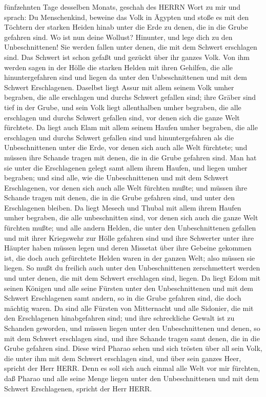 fünfzehnten Tage desselben Monats, geschah des HERRN Wort zu mir und
sprach:  Du Menschenkind, beweine das Volk in Ägypten und
stoße es mit den Töchtern der starken Heiden hinab unter die Erde zu
denen, die in die Grube gefahren sind.  Wo ist nun deine
Wollust? Hinunter, und lege dich zu den Unbeschnittenen! 
Sie werden fallen unter denen, die mit dem Schwert erschlagen sind. Das
Schwert ist schon gefaßt und gezückt über ihr ganzes Volk. 
Von ihm werden sagen in der Hölle die starken Helden mit ihren Gehilfen,
die alle hinuntergefahren sind und liegen da unter den Unbeschnittenen
und mit dem Schwert Erschlagenen.  Daselbst liegt Assur mit
allem seinem Volk umher begraben, die alle erschlagen und durchs Schwert
gefallen sind;  ihre Gräber sind tief in der Grube, und
sein Volk liegt allenthalben umher begraben, die alle erschlagen und
durchs Schwert gefallen sind, vor denen sich die ganze Welt fürchtete.
 Da liegt auch Elam mit allem seinem Haufen umher begraben,
die alle erschlagen und durchs Schwert gefallen sind und
hinuntergefahren als die Unbeschnittenen unter die Erde, vor denen sich
auch alle Welt fürchtete; und müssen ihre Schande tragen mit denen, die
in die Grube gefahren sind.  Man hat sie unter die
Erschlagenen gelegt samt allem ihrem Haufen, und liegen umher begraben;
und sind alle, wie die Unbeschnittenen und mit dem Schwert Erschlagenen,
vor denen sich auch alle Welt fürchten mußte; und müssen ihre Schande
tragen mit denen, die in die Grube gefahren sind, und unter den
Erschlagenen bleiben.  Da liegt Mesech und Thubal mit allem
ihrem Haufen umher begraben, die alle unbeschnitten sind, vor denen sich
auch die ganze Welt fürchten mußte;  und alle andern
Helden, die unter den Unbeschnittenen gefallen und mit ihrer Kriegswehr
zur Hölle gefahren sind und ihre Schwerter unter ihre Häupter haben
müssen legen und deren Missetat über ihre Gebeine gekommen ist, die doch
auch gefürchtete Helden waren in der ganzen Welt; also müssen sie
liegen.  So mußt du freilich auch unter den Unbeschnittenen
zerschmettert werden und unter denen, die mit dem Schwert erschlagen
sind, liegen.  Da liegt Edom mit seinen Königen und alle
seine Fürsten unter den Unbeschnittenen und mit dem Schwert Erschlagenen
samt andern, so in die Grube gefahren sind, die doch mächtig waren.
 Da sind alle Fürsten von Mitternacht und alle Sidonier,
die mit den Erschlagenen hinabgefahren sind; und ihre schreckliche
Gewalt ist zu Schanden geworden, und müssen liegen unter den
Unbeschnittenen und denen, so mit dem Schwert erschlagen sind, und ihre
Schande tragen samt denen, die in die Grube gefahren sind. 
Diese wird Pharao sehen und sich trösten über all sein Volk, die unter
ihm mit dem Schwert erschlagen sind, und über sein ganzes Heer, spricht
der Herr HERR.  Denn es soll sich auch einmal alle Welt vor
mir fürchten, daß Pharao und alle seine Menge liegen unter den
Unbeschnittenen und mit dem Schwert Erschlagenen, spricht der Herr HERR.

